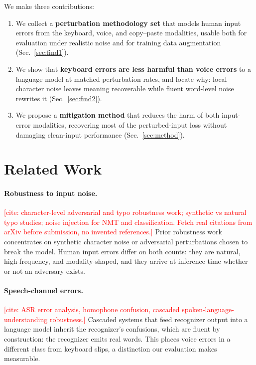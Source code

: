 \documentclass[11pt]{article}
\newcommand{\todo}[1]{\textcolor{red}{[#1]}}
\begin{document}
We make three contributions:
\begin{enumerate}[label=\arabic*.,leftmargin=1.35em,topsep=1pt,itemsep=1pt,parsep=0pt,partopsep=0pt]
\item We collect a \textbf{perturbation methodology set} that models human input errors from the
keyboard, voice, and copy--paste modalities, usable both for evaluation under realistic noise and for training
data augmentation (Sec.~\ref{sec:find1}).
\item We show that \textbf{keyboard errors are less harmful than voice errors} to a language model
at matched perturbation rates, and locate why: local character noise leaves meaning recoverable
while fluent word-level noise rewrites it (Sec.~\ref{sec:find2}).
\item We propose a \textbf{mitigation method} that reduces the harm of both input-error
modalities, recovering most of the perturbed-input loss without damaging clean-input performance
(Sec.~\ref{sec:method}).
\end{enumerate}

\section{Related Work}
\label{sec:related}

\paragraph{Robustness to input noise.} \todo{cite: character-level adversarial and typo robustness
work; synthetic vs natural typo studies; noise injection for NMT and classification. Fetch real
citations from arXiv before submission, no invented references.} Prior robustness work
concentrates on synthetic character noise or adversarial perturbations chosen to break the model.
Human input errors differ on both counts: they are natural, high-frequency, and modality-shaped,
and they arrive at inference time whether or not an adversary exists.

\paragraph{Speech-channel errors.} \todo{cite: ASR error analysis, homophone confusion, cascaded
spoken-language-understanding robustness.} Cascaded systems that feed recognizer output into a
language model inherit the recognizer's confusions, which are fluent by construction: the
recognizer emits real words. This places voice errors in a different class from keyboard slips,
a distinction our evaluation makes measurable.
\end{document}
